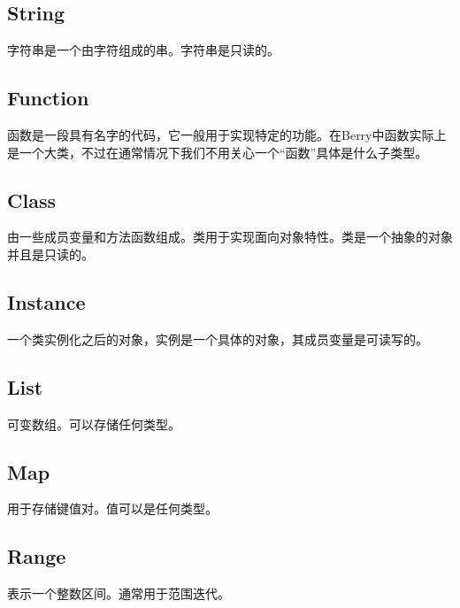 \subsection{String}

字符串是一个由字符组成的串。字符串是只读的。

\subsection{Function}

函数是一段具有名字的代码，它一般用于实现特定的功能。在Berry中函数实际上是一个大类，不过在通常情况下我们不用关心一个``函数''具体是什么子类型。

\subsection{Class}

由一些成员变量和方法函数组成。类用于实现面向对象特性。类是一个抽象的对象并且是只读的。

\subsection{Instance}

一个类实例化之后的对象，实例是一个具体的对象，其成员变量是可读写的。

\subsection{List}

可变数组。可以存储任何类型。

\subsection{Map}

用于存储键值对。值可以是任何类型。

\subsection{Range}

表示一个整数区间。通常用于范围迭代。
